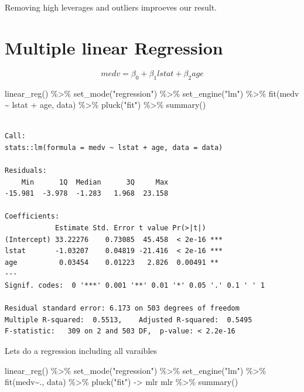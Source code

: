\documentclass[
  letterpaper,
  DIV=11,
  numbers=noendperiod]{scrreprt}
\newenvironment{Shaded}{\begin{snugshade}}{\end{snugshade}}
\newcommand{\FunctionTok}[1]{\textcolor[rgb]{0.02,0.16,0.49}{#1}}
\newcommand{\NormalTok}[1]{\textcolor[rgb]{0.33,0.33,0.33}{#1}}
\newcommand{\OtherTok}[1]{\textcolor[rgb]{0.85,0.12,0.09}{#1}}
\newcommand{\SpecialCharTok}[1]{\textcolor[rgb]{0.00,0.46,0.62}{#1}}
\newcommand{\StringTok}[1]{\textcolor[rgb]{0.00,0.50,0.00}{#1}}
\begin{document}
Removing high leverages and outliers improeves our result.

\hypertarget{multiple-linear-regression-1}{%
\section{Multiple linear
Regression}\label{multiple-linear-regression-1}}

\[
medv = \beta_0 + \beta_1 lstat + \beta_2 age 
\]

\begin{Shaded}
\begin{Highlighting}[]
\FunctionTok{linear\_reg}\NormalTok{() }\SpecialCharTok{\%\textgreater{}\%} 
  \FunctionTok{set\_mode}\NormalTok{(}\StringTok{"regression"}\NormalTok{) }\SpecialCharTok{\%\textgreater{}\%} 
  \FunctionTok{set\_engine}\NormalTok{(}\StringTok{"lm"}\NormalTok{) }\SpecialCharTok{\%\textgreater{}\%} 
  \FunctionTok{fit}\NormalTok{(medv }\SpecialCharTok{\textasciitilde{}}\NormalTok{ lstat }\SpecialCharTok{+}\NormalTok{ age, data) }\SpecialCharTok{\%\textgreater{}\%} 
  \FunctionTok{pluck}\NormalTok{(}\StringTok{"fit"}\NormalTok{) }\SpecialCharTok{\%\textgreater{}\%} 
  \FunctionTok{summary}\NormalTok{()}
\end{Highlighting}
\end{Shaded}

\begin{verbatim}

Call:
stats::lm(formula = medv ~ lstat + age, data = data)

Residuals:
    Min      1Q  Median      3Q     Max 
-15.981  -3.978  -1.283   1.968  23.158 

Coefficients:
            Estimate Std. Error t value Pr(>|t|)    
(Intercept) 33.22276    0.73085  45.458  < 2e-16 ***
lstat       -1.03207    0.04819 -21.416  < 2e-16 ***
age          0.03454    0.01223   2.826  0.00491 ** 
---
Signif. codes:  0 '***' 0.001 '**' 0.01 '*' 0.05 '.' 0.1 ' ' 1

Residual standard error: 6.173 on 503 degrees of freedom
Multiple R-squared:  0.5513,    Adjusted R-squared:  0.5495 
F-statistic:   309 on 2 and 503 DF,  p-value: < 2.2e-16
\end{verbatim}

Lets do a regression including all varaibles

\begin{Shaded}
\begin{Highlighting}[]
\FunctionTok{linear\_reg}\NormalTok{() }\SpecialCharTok{\%\textgreater{}\%} 
  \FunctionTok{set\_mode}\NormalTok{(}\StringTok{"regression"}\NormalTok{) }\SpecialCharTok{\%\textgreater{}\%} 
  \FunctionTok{set\_engine}\NormalTok{(}\StringTok{"lm"}\NormalTok{) }\SpecialCharTok{\%\textgreater{}\%} 
  \FunctionTok{fit}\NormalTok{(medv}\SpecialCharTok{\textasciitilde{}}\NormalTok{., data) }\SpecialCharTok{\%\textgreater{}\%} 
  \FunctionTok{pluck}\NormalTok{(}\StringTok{"fit"}\NormalTok{) }\OtherTok{{-}\textgreater{}}\NormalTok{ mlr}
\NormalTok{mlr }\SpecialCharTok{\%\textgreater{}\%} \FunctionTok{summary}\NormalTok{()}
\end{Highlighting}
\end{Shaded}
\end{document}

